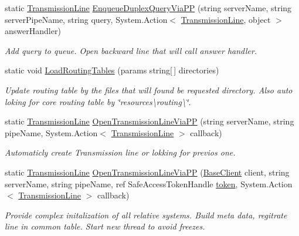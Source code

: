 \begin{DoxyCompactItemize}
static \mbox{\hyperlink{class_pipes_provider_1_1_client_1_1_transmission_line}{Transmission\+Line}} \mbox{\hyperlink{class_uniform_client_1_1_base_client_a82dbf660ec06b5c05730ff57b63b4f28}{Enqueue\+Duplex\+Query\+Via\+PP}} (string server\+Name, string server\+Pipe\+Name, string query, System.\+Action$<$ \mbox{\hyperlink{class_pipes_provider_1_1_client_1_1_transmission_line}{Transmission\+Line}}, object $>$ answer\+Handler)
\begin{DoxyCompactList}\small\item\em Add query to queue. Open backward line that will call answer handler. \end{DoxyCompactList}\item 
static void \mbox{\hyperlink{class_uniform_client_1_1_base_client_a5f8f22aa4ab8219fb5f1b6a358f68daf}{Load\+Routing\+Tables}} (params string\mbox{[}$\,$\mbox{]} directories)
\begin{DoxyCompactList}\small\item\em Update routing table by the files that will found be requested directory. Also auto loking for core routing table by \char`\"{}resources\textbackslash{}routing\textbackslash{}\char`\"{}. \end{DoxyCompactList}\item 
static \mbox{\hyperlink{class_pipes_provider_1_1_client_1_1_transmission_line}{Transmission\+Line}} \mbox{\hyperlink{class_uniform_client_1_1_base_client_a851ce49c50011eb0ed2552663c7731ab}{Open\+Transmission\+Line\+Via\+PP}} (string server\+Name, string pipe\+Name, System.\+Action$<$ \mbox{\hyperlink{class_pipes_provider_1_1_client_1_1_transmission_line}{Transmission\+Line}} $>$ callback)
\begin{DoxyCompactList}\small\item\em Automaticly create Transmission line or lokking for previos one. \end{DoxyCompactList}\item 
static \mbox{\hyperlink{class_pipes_provider_1_1_client_1_1_transmission_line}{Transmission\+Line}} \mbox{\hyperlink{class_uniform_client_1_1_base_client_a79c6e490b20b4b8c649af33926e20017}{Open\+Transmission\+Line\+Via\+PP}} (\mbox{\hyperlink{class_uniform_client_1_1_base_client}{Base\+Client}} client, string server\+Name, string pipe\+Name, ref Safe\+Access\+Token\+Handle \mbox{\hyperlink{class_uniform_client_1_1_base_client_ad99bcf3d1afeed6eadca7035c926d2b7}{token}}, System.\+Action$<$ \mbox{\hyperlink{class_pipes_provider_1_1_client_1_1_transmission_line}{Transmission\+Line}} $>$ callback)
\begin{DoxyCompactList}\small\item\em Provide complex initalization of all relative systems. Build meta data, regitrate line in common table. Start new thread to avoid freezes. \end{DoxyCompactList}\end{DoxyCompactItemize}
